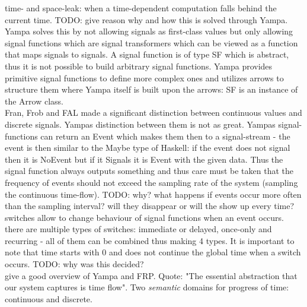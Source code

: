 time- and space-leak: when a time-dependent computation falls behind the current time. TODO: give reason why and how this is solved through Yampa. \\
Yampa solves this by not allowing signals as first-class values but only allowing signal functions which are signal transformers which can be viewed as a function that maps signals to signals. A signal function is of type SF which is abstract, thus it is not possible to build arbitrary signal functions. Yampa provides primitive signal functions to define more complex ones and utilizes arrows \cite{Hughes2004} to structure them where Yampa itself is built upon the arrows: SF is an instance of the Arrow class. \\

Fran, Frob and FAL made a significant distinction between continuous values and discrete signals. Yampas distinction between them is not as great. Yampas signal-functions can return an Event which makes them then to a signal-stream - the event is then similar to the Maybe type of Haskell: if the event does not signal then it is NoEvent but if it Signals it is Event with the given data. Thus the signal function always outputs something and thus care must be taken that the frequency of events should not exceed the sampling rate of the system (sampling the continuous time-flow). TODO: why? what happens if events occur more often than the sampling interval? will they disappear or will the show up every time? \\

switches allow to change behaviour of signal functions when an event occurs. there are multiple types of switches: immediate or delayed, once-only and recurring - all of them can be combined thus making 4 types. It is important to note that time starts with 0 and does not continue the global time when a switch occurs. TODO: why was this decided? \\

\cite{Nilsson2002} give a good overview of Yampa and FRP. Quote: "The essential abstraction that our system captures is time flow". Two \textit{semantic} domains for progress of time: continuous and discrete. \\

